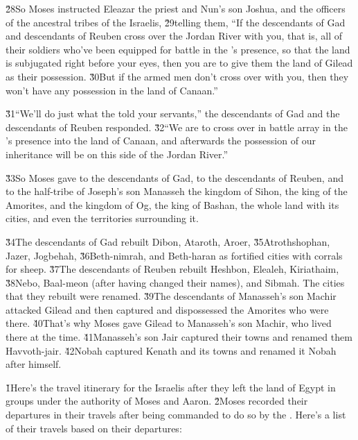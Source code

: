 \v{28}So Moses instructed Eleazar the priest and Nun's son Joshua, and the officers of the ancestral tribes of the Israelis, \v{29}telling them, ``If the descendants of Gad and descendants of Reuben cross over the Jordan River with you, that is, all of their soldiers who've been equipped for battle in the 's presence, so that the land is subjugated right before your eyes, then you are to give them the land of Gilead as their possession. \v{30}But if the armed men don't cross over with you, then they won't have any possession in the land of Canaan.''

\v{31}``We'll do just what the  told your servants,'' the descendants of Gad and the descendants of Reuben responded. \v{32}``We are to cross over in battle array in the 's presence into the land of Canaan, and afterwards the possession of our inheritance will be on this side of the Jordan River.''

\v{33}So Moses gave to the descendants of Gad, to the descendants of Reuben, and to the half-tribe of Joseph's son Manasseh the kingdom of Sihon, the king of the Amorites, and the kingdom of Og, the king of Bashan, the whole land with its cities, and even the territories surrounding it.

\v{34}The descendants of Gad rebuilt Dibon, Ataroth, Aroer, \v{35}Atrothshophan, Jazer, Jogbehah, \v{36}Beth-nimrah, and Beth-haran as fortified cities with corrals for sheep. \v{37}The descendants of Reuben rebuilt Heshbon, Elealeh, Kiriathaim, \v{38}Nebo, Baal-meon (after having changed their names), and Sibmah. The cities that they rebuilt were renamed. \v{39}The descendants of Manasseh's son Machir attacked Gilead and then captured and dispossessed the Amorites who were there. \v{40}That's why Moses gave Gilead to Manasseh's son Machir, who lived there at the time. \v{41}Manasseh's son Jair captured their towns and renamed them Havvoth-jair. \v{42}Nobah captured Kenath and its towns and renamed it Nobah after himself.

\v{1}Here's the travel itinerary for the Israelis after they left the land of Egypt in groups under the authority of Moses and Aaron. \v{2}Moses recorded their departures in their travels after being commanded to do so by the . Here's a list of their travels based on their departures:

